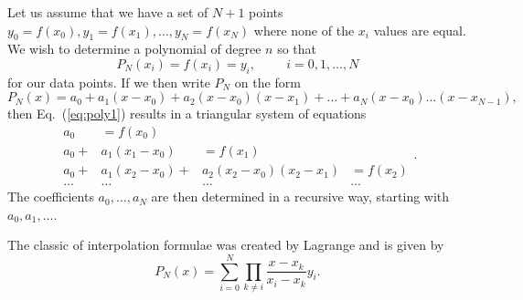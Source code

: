  Let us assume that we have a set of $N+1$ points 
$y_0=f(x_0),y_1=f(x_1),\dots,y_N=f(x_N)$ where none of the $x_i$ values are equal.
We wish to determine
a polynomial of degree $n$ so that
\begin{equation}
  P_N(x_i)=f(x_i)=y_i, \hspace{1cm} i=0,1,\dots, N
  \label{eq:poly1}
\end{equation}
for our data points. 
If we then write $P_N$ on the form
\begin{equation}
   P_N(x)=a_0+a_1(x-x_0)+a_2(x-x_0)(x-x_1) + \dots+ a_N(x-x_0)\dots(x-x_{N-1}),
   \label{eq:poly2}
\end{equation}
then Eq.\ (\ref{eq:poly1}) results in a triangular system of equations
\[
      \begin{array}{ccccc} a_0&=f(x_0)  &  &  \\
                           a_0+&a_1(x_1-x_0)&=f(x_1) &  \\
                           a_0+&a_1(x_2-x_0)+&a_2(x_2-x_0)(x_2-x_1)&=f(x_2)  \\
                           \dots & \dots &\dots & \dots \end{array}.
\]
The coefficients $a_0,\dots,a_N$ are then determined in a recursive way,
starting with $a_0,a_1,\dots$. 

The classic of interpolation formulae was created by Lagrange and is given by
\begin{equation}
   P_N(x)=\sum_{i=0}^{N}\prod_{k\ne i} \frac{x-x_k}{x_i-x_k}y_i.
\label{eq:lagrange}
\end{equation}

